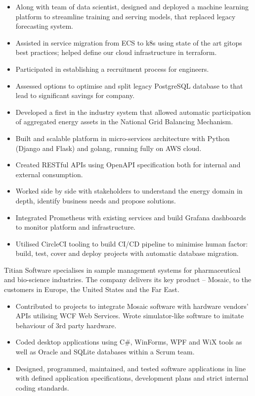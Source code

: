 \documentclass[12pt,english]{resume}
\begin{document}
		\begin{itemize}
			\item Along with team of data scientist, designed and deployed a machine learning platform to streamline training and serving models, that replaced legacy forecasting system.
			\item Assisted in service migration from ECS to k8s using state of the art gitops best practices; helped define our cloud infrastructure in terraform.
			\item Participated in establishing a recruitment process for engineers.
			\item Assessed options to optimise and split legacy PostgreSQL database to that lead to significant savings for company.
		\end{itemize}

		
		\begin{itemize}
			\item Developed a first in the industry system that allowed automatic participation of aggregated energy assets in the National Grid Balancing Mechanism.
			\item Built and scalable platform in micro-services architecture with Python (Django and Flask) and golang, running fully on AWS cloud.
			\item Created RESTful APIs using OpenAPI specification both for internal and external consumption.
			\item Worked side by side with stakeholders to understand the energy domain in depth, identify business needs and propose solutions.
			\item Integrated Prometheus with existing services and build Grafana dashboards to monitor  platform and infrastructure.
			\item Utilised CircleCI tooling to build CI/CD pipeline to minimise human factor: build, test, cover and deploy projects with automatic database migration.
		\end{itemize}
				
		Titian Software specialises in sample management systems for pharmaceutical and bio-science industries. The company delivers its key product – Mosaic, to the customers in Europe, the United States and the Far East.
		\begin{itemize}
			\item Contributed to projects to integrate Mosaic software with hardware vendors’ APIs utilising WCF Web Services. Wrote simulator-like software to imitate behaviour of 3rd party hardware.
			\item Coded desktop applications using C\#, WinForms, WPF and WiX tools as well as Oracle and SQLite databases within a Scrum team.
			\item Designed, programmed, maintained, and tested software applications in line with defined application specifications, development plans and strict internal coding standards.
		\end{itemize}
		
\end{document}
